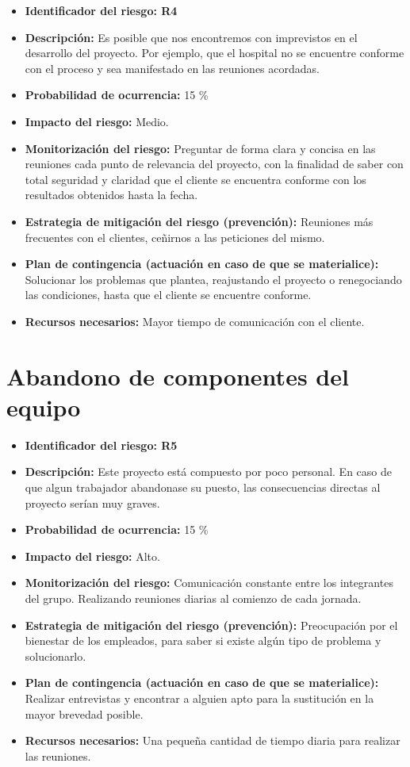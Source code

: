 \begin{itemize}
	\item \textbf{Identificador del riesgo: R4 }
	\item \textbf{Descripción: } Es posible que nos encontremos con imprevistos en el desarrollo del proyecto. Por ejemplo, que el hospital no se encuentre conforme con el proceso y sea manifestado en las reuniones acordadas. 
	\item \textbf{Probabilidad de ocurrencia: } 15 \%
	\item \textbf{Impacto del riesgo: } Medio. 
	\item \textbf{Monitorización del riesgo: } Preguntar de forma clara y concisa en las reuniones cada punto de relevancia del proyecto, con la finalidad de saber con total seguridad y claridad que el cliente se encuentra conforme con los resultados obtenidos hasta la fecha.  
	\item \textbf{Estrategia de mitigación del riesgo (prevención): }  Reuniones más frecuentes con el clientes, ceñirnos a las peticiones del mismo.
	\item \textbf{Plan de contingencia (actuación en caso de que se materialice): } Solucionar los problemas que plantea, reajustando el proyecto o renegociando las condiciones, hasta que el cliente se encuentre conforme.
	\item \textbf{Recursos necesarios: } Mayor tiempo de comunicación con el cliente.
\end{itemize}

\section{Abandono de componentes del equipo}

\begin{itemize}
	\item \textbf{Identificador del riesgo: R5 }
	\item \textbf{Descripción: } Este proyecto está compuesto por poco personal. En caso de que algun trabajador abandonase su puesto, las consecuencias directas al proyecto serían muy graves.
	\item \textbf{Probabilidad de ocurrencia: } 15 \%
	\item \textbf{Impacto del riesgo: } Alto.
	\item \textbf{Monitorización del riesgo: } Comunicación constante entre los integrantes del grupo. Realizando reuniones diarias al comienzo de cada jornada.   
	\item \textbf{Estrategia de mitigación del riesgo (prevención): } Preocupación por el bienestar de los empleados, para saber si existe algún tipo de problema y solucionarlo.   
	\item \textbf{Plan de contingencia (actuación en caso de que se materialice): } Realizar entrevistas y encontrar a alguien apto para la sustitución en la mayor brevedad posible.
	\item \textbf{Recursos necesarios: } Una pequeña cantidad de tiempo diaria para realizar las reuniones. 
\end{itemize}


